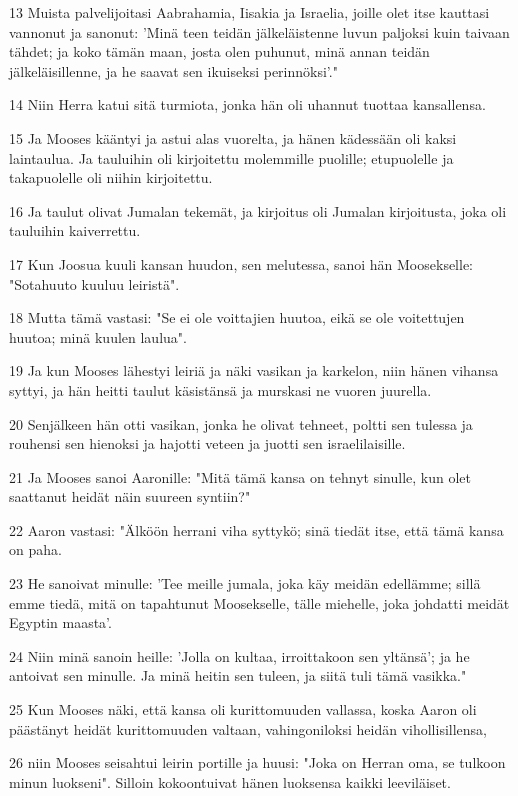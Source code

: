 \par 13 Muista palvelijoitasi Aabrahamia, Iisakia ja Israelia, joille olet itse kauttasi vannonut ja sanonut: 'Minä teen teidän jälkeläistenne luvun paljoksi kuin taivaan tähdet; ja koko tämän maan, josta olen puhunut, minä annan teidän jälkeläisillenne, ja he saavat sen ikuiseksi perinnöksi'."
\par 14 Niin Herra katui sitä turmiota, jonka hän oli uhannut tuottaa kansallensa.
\par 15 Ja Mooses kääntyi ja astui alas vuorelta, ja hänen kädessään oli kaksi laintaulua. Ja tauluihin oli kirjoitettu molemmille puolille; etupuolelle ja takapuolelle oli niihin kirjoitettu.
\par 16 Ja taulut olivat Jumalan tekemät, ja kirjoitus oli Jumalan kirjoitusta, joka oli tauluihin kaiverrettu.
\par 17 Kun Joosua kuuli kansan huudon, sen melutessa, sanoi hän Moosekselle: "Sotahuuto kuuluu leiristä".
\par 18 Mutta tämä vastasi: "Se ei ole voittajien huutoa, eikä se ole voitettujen huutoa; minä kuulen laulua".
\par 19 Ja kun Mooses lähestyi leiriä ja näki vasikan ja karkelon, niin hänen vihansa syttyi, ja hän heitti taulut käsistänsä ja murskasi ne vuoren juurella.
\par 20 Senjälkeen hän otti vasikan, jonka he olivat tehneet, poltti sen tulessa ja rouhensi sen hienoksi ja hajotti veteen ja juotti sen israelilaisille.
\par 21 Ja Mooses sanoi Aaronille: "Mitä tämä kansa on tehnyt sinulle, kun olet saattanut heidät näin suureen syntiin?"
\par 22 Aaron vastasi: "Älköön herrani viha syttykö; sinä tiedät itse, että tämä kansa on paha.
\par 23 He sanoivat minulle: 'Tee meille jumala, joka käy meidän edellämme; sillä emme tiedä, mitä on tapahtunut Moosekselle, tälle miehelle, joka johdatti meidät Egyptin maasta'.
\par 24 Niin minä sanoin heille: 'Jolla on kultaa, irroittakoon sen yltänsä'; ja he antoivat sen minulle. Ja minä heitin sen tuleen, ja siitä tuli tämä vasikka."
\par 25 Kun Mooses näki, että kansa oli kurittomuuden vallassa, koska Aaron oli päästänyt heidät kurittomuuden valtaan, vahingoniloksi heidän vihollisillensa,
\par 26 niin Mooses seisahtui leirin portille ja huusi: "Joka on Herran oma, se tulkoon minun luokseni". Silloin kokoontuivat hänen luoksensa kaikki leeviläiset.
